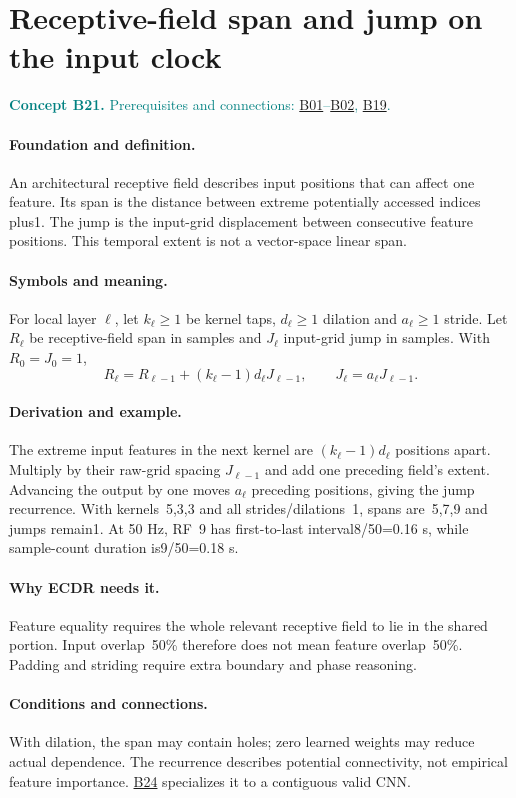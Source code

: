 \documentclass[11pt,a4paper]{article}
\newcommand{\conceptid}{Front matter}
\newcommand{\concept}[3]{\clearpage\renewcommand{\conceptid}{#1}%
\section{#2}\label{concept:#1}%
\textcolor{teal}{\textbf{Concept #1.} Prerequisites and connections: #3.}\par
\typeout{ECDR-CONCEPT-START #1 PAGE=\thepage}}
\begin{document}
\concept{B21}{Receptive-field span and jump on the input clock}{\hyperref[concept:B01]{B01}--\hyperref[concept:B02]{B02}, \hyperref[concept:B19]{B19}}
\paragraph{Foundation and definition.}
An architectural receptive field describes input positions that can affect
one feature. Its span is the distance between extreme potentially accessed
indices plus1. The jump is the input-grid displacement between consecutive
feature positions. This temporal extent is not a vector-space linear span.
\paragraph{Symbols and meaning.}
For local layer $\ell$, let $k_\ell\ge1$ be kernel taps, $d_\ell\ge1$
dilation and $a_\ell\ge1$ stride. Let $R_\ell$ be receptive-field span
in samples and $J_\ell$ input-grid jump in samples. With
$R_0=J_0=1$,
\[
 R_\ell=R_{\ell-1}+(k_\ell-1)d_\ell J_{\ell-1},\qquad
 J_\ell=a_\ell J_{\ell-1}.
\]
\paragraph{Derivation and example.}
The extreme input features in the next kernel are
$(k_\ell-1)d_\ell$ positions apart. Multiply by their raw-grid spacing
$J_{\ell-1}$ and add one preceding field's extent. Advancing the output
by one moves $a_\ell$ preceding positions, giving the jump recurrence.
With kernels~5,3,3 and all strides/dilations~1, spans are~5,7,9 and jumps
remain1. At 50 Hz, RF~9 has first-to-last interval8/50=0.16 s, while
sample-count duration is9/50=0.18 s.
\paragraph{Why ECDR needs it.}
Feature equality requires the whole relevant receptive field to lie in
the shared portion. Input overlap~50\% therefore does not mean feature
overlap~50\%. Padding and striding require extra boundary and phase reasoning.
\paragraph{Conditions and connections.}
With dilation, the span may contain holes; zero learned weights may reduce
actual dependence. The recurrence describes potential connectivity, not
empirical feature importance. \hyperref[concept:B24]{B24} specializes it to a contiguous valid CNN.
\par\label{endconcept:B21}
\end{document}

